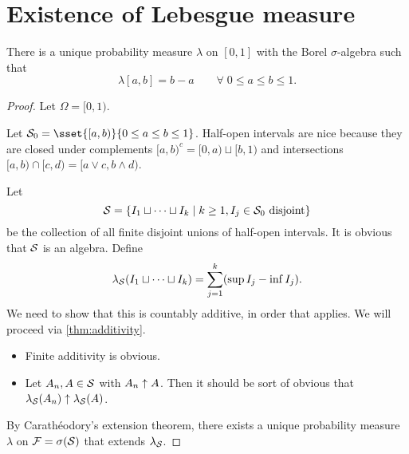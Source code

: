 \section{Existence of Lebesgue measure} \label{sec:lebesgue}
\begin{theorem*} \label{thm:lebesgue}
    There is a unique probability measure $\lambda$ on
    $[0, 1]$ with the Borel $\sigma$-algebra such that \[
        \lambda[a, b] = b - a \qquad \forall\; 0 \le a \le b \le 1.
    \]
\end{theorem*}
\begin{proof}
    Let $\Omega = [0, 1)$.

    Let $\mcS_0 = \sset{[a, b)}{0 \le a \le b \le 1}$.
    Half-open intervals are nice because they are closed under complements
    $[a, b)^c = [0, a) \sqcup [b, 1)$ and intersections
    $[a, b) \cap [c, d) = [a \vee c, b \wedge d)$.

    Let \[
        \mathcal{S} = \{I_1 \sqcup \cdots \sqcup I_k
                \mid k \ge 1, I_j \in \mathcal{S}_0 \text{ disjoint}\}
    \] be the collection of all finite disjoint unions of
    half-open intervals.
    It is obvious that $\mathcal{S}$ is an algebra.
    Define \[
        \lambda_{\mathcal{S}}(I_1 \sqcup \dots \sqcup I_k)
        = \sum_{j=1}^k (\sup I_j - \inf I_j).
    \]
    We need to show that this is countably additive, in order that
     applies.
    We will proceed via \cref{thm:additivity}.
    \begin{itemize}
        \item Finite additivity is obvious.
        \item Let $A_n, A \in \mathcal{S}$ with $A_n \uparrow A$.
        Then it should be sort of obvious that
        $\lambda_{\mathcal{S}}(A_n) \uparrow \lambda_{\mathcal{S}}(A)$. \TODO[Yes?]
    \end{itemize}
    By Carathéodory's extension theorem, there exists a unique
    probability measure $\lambda$ on $\mathcal F = \sigma(\mathcal{S})$ that extends
    $\lambda_{\mathcal{S}}$.
\end{proof}
